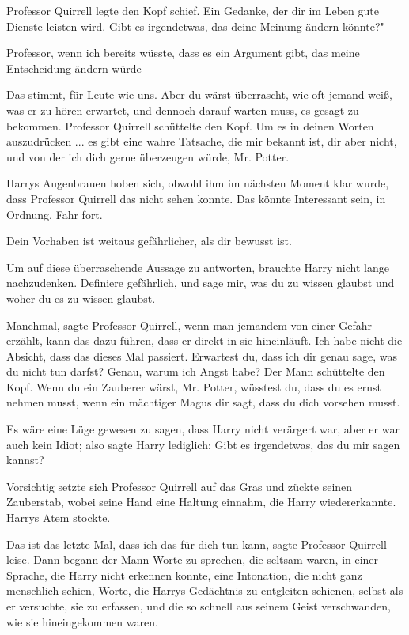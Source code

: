 Professor Quirrell legte den Kopf schief. \glqq Ein Gedanke, der dir im Leben
gute Dienste leisten wird. Gibt es irgendetwas, das deine Meinung ändern
könnte?"

\glqq Professor, wenn ich bereits wüsste, dass es ein Argument gibt, das meine
Entscheidung ändern würde -\grqq{}

\glqq Das stimmt, für Leute wie uns. Aber du wärst überrascht, wie oft jemand
weiß, was er zu hören erwartet, und dennoch darauf warten muss, es gesagt zu
bekommen.\grqq{} Professor Quirrell schüttelte den Kopf. \glqq Um es in deinen
Worten auszudrücken ... es gibt eine wahre Tatsache, die mir bekannt ist, dir
aber nicht, und von der ich dich gerne überzeugen würde, Mr. Potter.\grqq{}

Harrys Augenbrauen hoben sich, obwohl ihm im nächsten Moment klar wurde, dass
Professor Quirrell das nicht sehen konnte. \glqq Das könnte Interessant sein, in
Ordnung. Fahr fort.\grqq{}

\glqq Dein Vorhaben ist weitaus gefährlicher, als dir bewusst ist.\grqq{}

Um auf diese überraschende Aussage zu antworten, brauchte Harry nicht lange
nachzudenken. \glqq Definiere gefährlich, und sage mir, was du zu wissen glaubst
und woher du es zu wissen glaubst.\grqq{}

\glqq Manchmal\grqq{}, sagte Professor Quirrell, \glqq wenn man jemandem von
einer Gefahr erzählt, kann das dazu führen, dass er direkt in sie hineinläuft.
Ich habe nicht die Absicht, dass das dieses Mal passiert. Erwartest du, dass ich
dir genau sage, was du nicht tun darfst? Genau, warum ich Angst habe?\grqq{} Der
Mann schüttelte den Kopf. \glqq Wenn du ein Zauberer wärst, Mr. Potter, wüsstest
du, dass du es ernst nehmen musst, wenn ein mächtiger Magus dir sagt, dass du
dich vorsehen musst.\grqq{}

Es wäre eine Lüge gewesen zu sagen, dass Harry nicht verärgert war, aber er war
auch kein Idiot; also sagte Harry lediglich: \glqq Gibt es irgendetwas, das du
mir sagen kannst?\grqq{}

Vorsichtig setzte sich Professor Quirrell auf das Gras und zückte seinen
Zauberstab, wobei seine Hand eine Haltung einnahm, die Harry wiedererkannte.
Harrys Atem stockte.

\glqq Das ist das letzte Mal, dass ich das für dich tun kann\grqq{}, sagte
Professor Quirrell leise. Dann begann der Mann Worte zu sprechen, die seltsam
waren, in einer Sprache, die Harry nicht erkennen konnte, eine Intonation, die
nicht ganz menschlich schien, Worte, die Harrys Gedächtnis zu entgleiten
schienen, selbst als er versuchte, sie zu erfassen, und die so schnell aus
seinem Geist verschwanden, wie sie hineingekommen waren.

